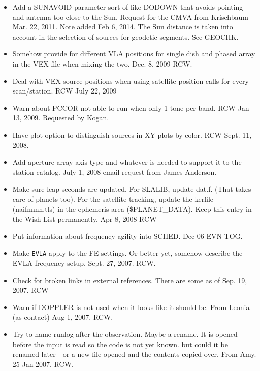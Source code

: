 \documentclass{report}
\begin{document}
\begin{itemize}
\item Add a SUNAVOID parameter sort of like DODOWN that avoids pointing
      and antenna too close to the Sun.  Request for the CMVA from
      Krischbaum  Mar. 22, 2011.  Note added Feb 6, 2014.  The Sun
      distance is taken into account in the selection of sources for
      geodetic segments.  See GEOCHK.

\item Somehow provide for different VLA positions for single dish
      and phased array in the VEX file when mixing the two.  Dec. 8,
      2009 RCW.

\item Deal with VEX source positions when using satellite position
      calls for every scan/station.     RCW July 22, 2009

\item Warn about PCCOR not able to run when only 1 tone per band.  RCW
      Jan 13, 2009.  Requested by Kogan.

\item Have plot option to distinguish sources in XY plots by color.
      RCW  Sept. 11, 2008.

\item Add aperture array axis type and whatever is needed to support it
      to the station catalog.  July 1, 2008 email request from
      James Anderson.

\item Make sure leap seconds are updated.
      For SLALIB, update dat.f.  (That takes care of planets too).
      For the satellite tracking, update the kerfile (naifnnnn.tls) in the
         ephemeris area (\$PLANET\_DATA).
      Keep this entry in the Wish List permanently.  Apr 8, 2008 RCW

\item Put information about frequency agility into SCHED. Dec 06 EVN TOG.

\item Make {\tt EVLA} apply to the FE settings.  Or better yet, somehow
      describe the EVLA frequency setup.  Sept. 27, 2007.  RCW.

\item Check for broken links in external references.  There are some
      as of Sep. 19, 2007.  RCW

\item Warn if DOPPLER is not used when it looks like it should be.
      From Leonia (as contact) Aug 1, 2007.  RCW.

\item Try to name runlog after the observation.  Maybe a rename.  It
      is opened before the input is read so the code is not yet known.
      but could it be renamed later - or a new file opened and the
      contents copied over.  From Amy.  25 Jan 2007.  RCW.


\end{itemize}
\end{document}
